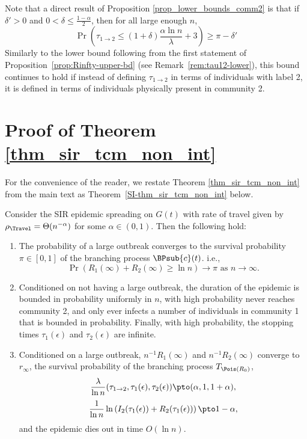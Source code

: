 \documentclass[11pt]{article}
\begin{document}
\begin{remark}\label{rmk:tau_1_2_upper_bd}
    Note that a direct result of Proposition \ref{prop_lower_bounds_comm2} is that if $\delta'>0$ and $0<\delta \leq \frac{1-\alpha}{2}$, then for all large enough $n$,
    $$
   \Pr\left( \tau_{1\to 2} \leq (1+\delta)\frac{\alpha\ln n}\lambda+3\right)\geq \pi-\delta'
    $$
Similarly to the lower bound following from the first statement of Proposition~\ref{prop:Rinfty-upper-bd} (see Remark~\ref{rem:tau12-lower}), this bound continues to hold if instead of defining $\tau_{1\to 2}$ in terms of individuals with label 2, it is defined in terms of individuals physically present in community 2.
    \end{remark}


\section{Proof of Theorem \ref{thm_sir_tcm_non_int}}

For the  convenience of the reader, we restate Theorem \ref{thm_sir_tcm_non_int} from the main text as Theorem~\ref{SI-thm_sir_tcm_non_int} below.

\begin{theorem}\label{SI-thm_sir_tcm_non_int}
    Consider the SIR epidemic spreading on $G(t)$ with rate of travel given by $\rho_\Travel = \Theta(n^{-\alpha})$ for some $\alpha \in (0, 1)$.
        Then the following hold:
    \begin{enumerate}[label=(\alph*)]
        \item\label{SI-thm:main-large-outbreak} The probability of a large  outbreak converges to the survival probability $\pi\in[0,1]$ of the branching process  $\BPsub{c}(t)$.
        i.e.,
        \[
            \Pr(R_1(\infty) + R_2(\infty) \geq \ln n) \to \pi \text{ as } n\to\infty.
        \]
           \item \label{SI-thm:main-survival-prob} Conditioned on not having a large outbreak, the duration of the epidemic is bounded in probability uniformly in $n$, with high probability never reaches community 2, and only ever infects a  number of individuals in community 1 that is bounded in probability.  Finally, with high probability, the stopping times $\tau_1(\epsilon)$ and $\tau_2(\epsilon)$ are infinite.
        \item \label{SI-thm:main-final-size}Conditioned on a large outbreak, $n^{-1} R_1(\infty)$ and $n^{-1} R_2(\infty)$ converge to $r_\infty$, the survival probability of the branching process $T_{\Pois(R_0)}$,           \[
            \frac{\lambda}{\ln n}(\tau_{1\to 2}, \tau_1(\epsilon), \tau_2(\epsilon)) \pto (\alpha, 1, 1+\alpha),
        \]
        \[
            \frac 1{\ln n}\ln\left(I_2(\tau_1(\epsilon))+R_2(\tau_1(\epsilon))\right)\pto 1-\alpha,
        \]
   and the epidemic dies out in time $O(\ln n)$.
       
    \end{enumerate}
\end{theorem}
    
\end{document}
